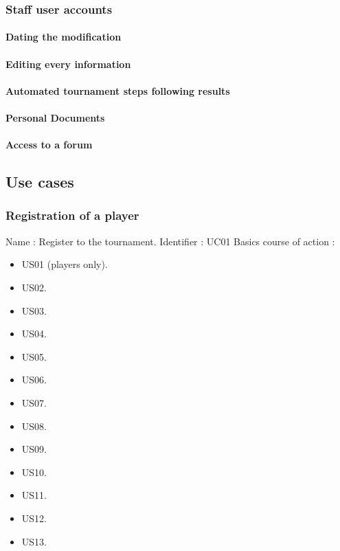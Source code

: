 \subsubsection{Staff user accounts}

\paragraph{Dating the modification}
\paragraph{Editing every information}
\paragraph{Automated tournament steps following results}
\paragraph{Personal Documents}
\paragraph{Access to a forum}

\subsection{Use cases}
\subsubsection{Registration of a player}

Name : Register to the tournament. \newline
Identifier : UC01 \newline
Basics course of action : \newline
\begin{itemize}
	\item US01 (players only).
	\item US02.
	\item US03.
	\item US04.
	\item US05.
	\item US06.
	\item US07.
	\item US08.
	\item US09.
	\item US10.
	\item US11.
	\item US12.
	\item US13.
\end{itemize}

